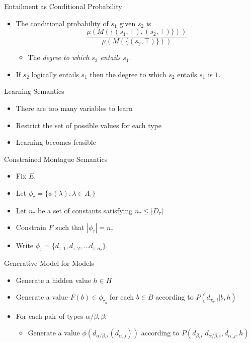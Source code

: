 \documentclass{beamer}
\newlength{\wideitemsep}
\let\olditem\item
\renewcommand{\item}{\setlength{\itemsep}{\wideitemsep}\olditem}
\begin{document}
\begin{frame}{Entailment as Conditional Probability}
  \begin{itemize}
  \item The conditional probability of $s_1$ given $s_2$ is
    $$\frac{\mu(M(\{(s_1, \top), (s_2, \top)\}))}{\mu(M(\{(s_2,\top)\}))}$$
    \begin{itemize}
    \item The {\em degree to which $s_2$ entails $s_1$\/}. 
    \end{itemize}
  \item If $s_2$ logically entails $s_1$ then the degree to which  $s_2$ entails $s_1$ is $1$.
\end{itemize}
\end{frame}

\begin{frame}{Learning Semantics}
  \begin{itemize}
  \item There are too many variables to learn
  \item Restrict the set of possible values for each type
  \item Learning becomes feasible
  \end{itemize}
\end{frame}

\begin{frame}{Constrained Montague Semantics}
\begin{itemize}
\item Fix $E$.
\item Let $\phi_\tau = \{\phi(\lambda) : \lambda\in \Lambda_\tau\}$
\item Let $n_\tau$ be a set of constants satisfying $n_\tau \le |D_\tau|$
\item Constrain $F$ such that $|\phi_\tau| = n_\tau$
\item Write $\phi_\tau = \{d_{\tau,1}, d_{\tau,2}, \ldots d_{\tau,
    n_\tau}\}$.
\end{itemize}
\end{frame}

\begin{frame}{Generative Model for Models}
\begin{itemize}
\item Generate a hidden value $h\in H$
\item Generate a value $F(b) \in \phi_{\tau_b}$ for each $b\in B$ according to
  $P(d_{\tau_b,i}|b, h)$
\item For each pair of types $\alpha/\beta, \beta$:
\begin{itemize}
\item Generate a value $\phi(d_{\alpha/\beta,i}(d_{\alpha,j}))$
  according to $P(d_{\beta,i}|d_{\alpha/\beta,i}, d_{\alpha,j},h)$
\end{itemize}
\end{itemize}
\end{frame}
\end{document}
